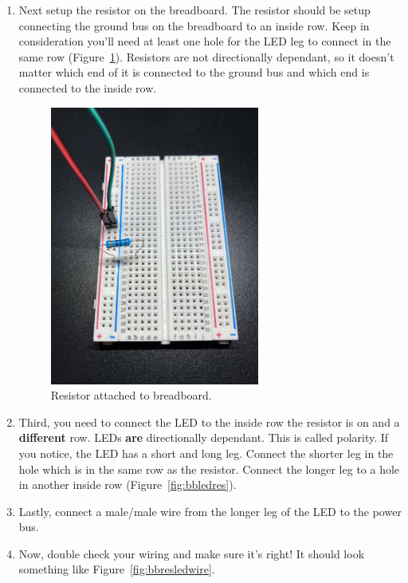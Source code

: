 \documentclass{article}\usepackage[]{graphicx}\usepackage[]{color}
\begin{document}
\begin{enumerate}
\item Next setup the resistor on the breadboard. The resistor should be setup connecting the ground bus on the breadboard to an inside row. Keep in consideration you'll need at least one hole for the LED leg to connect in the same row (Figure~\ref{fig:res}). Resistors are not directionally dependant, so it doesn't matter which end of it is connected to the ground bus and which end is connected to the inside row.
\begin{figure}[h]
\begin{center}
\includegraphics[width=0.65\textwidth]{res}
\caption{Resistor attached to breadboard.\label{fig:res}}
\end{center}
\end{figure}

\item Third, you need to connect the LED to the inside row the resistor is on and a \textbf{different} row. LEDs \textbf{are} directionally dependant. This is called polarity. If you notice, the LED has a short and long leg. Connect the shorter leg in the hole which is in the same row as the resistor. Connect the longer leg to a hole in another inside row (Figure~\ref{fig:bbledres}).

\item Lastly, connect a male/male wire from the longer leg of the LED to the power bus.

\item Now, double check your wiring and make sure it's right! It should look something like Figure~\ref{fig:bbresledwire}.



\end{enumerate}
\end{document}
